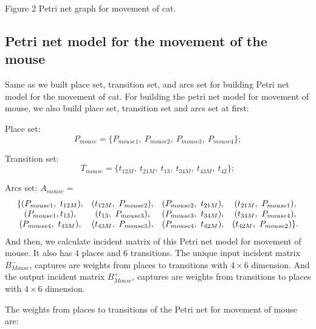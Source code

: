 \documentclass[11pt]{article}
\begin{document}
\begin{flushleft}
\begin{center}
	Figure 2 Petri net graph for movement of cat.
	\end{center}
    
	\newpage
	\subsection{Petri net model for the movement of the mouse}
	Same as we built place set, transition set, and arcs set for building Petri net model for the movement of cat. For building the petri net model for movement of mouse, we also build place set, transition set and arcs set at first:
	
	Place set: $$P_{mouse}=\{P_{mouse1},\ P_{mouse2},\ P_{mouse3},\ P_{mouse4}\};$$
	
	Transition set: $$T_{mouse}=\{t_{12M},\ t_{21M},\ t_{13},\ t_{34M},\  t_{43M},\ t_{42}\};$$
	
	Arcs set: 
	$A_{mouse}=$
	\begin{equation*}
	\begin{array}{*{4}c}
	\{(P_{mouse1},\ t_{12M}), & (t_{12M},\ P_{mouse2}), & (P_{mouse2},\ t_{21M}), & (t_{21M},\ P_{mouse1}),\\
	(P_{mouse1}, t_{13}), & (t_{13},\ P_{mouse3}), & (P_{mouse3},\ t_{34M}), & (t_{34M},\ P_{mouse4}),\\
	(P_{mouse4},\ t_{43M}), & (t_{43M},\ P_{mouse3}), & (P_{mouse4},\ t_{42M}), & (t_{42M},\ P_{mouse2})\}.
	\end{array}
	\end{equation*}
	And then, we calculate incident matrix of this Petri net model for movement of mouse. It also has 4 places and 6 transitions. The unique input incident matrix $B_{Mouse}^-$, captures are weights from places to transitions with $4\times 6$ dimension. And the output incident matrix $B_{Mouse}^+$, captures are weights from transitions to places with $4\times 6$ dimension.
	
	The weights from places to transitions of the Petri net for movement of mouse are:
	
	\begin{center}
	\begin{tabular}{ccccccc}


\end{tabular}
\end{center}
\end{flushleft}
\end{document}

